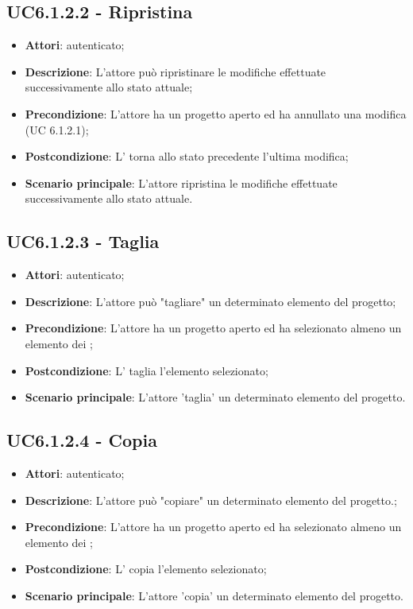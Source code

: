 \subsection{UC6.1.2.2 - Ripristina}
\label{ssec:UC6.1.2.2}
\begin{itemize}
\item \textbf{Attori}:  autenticato;
\item \textbf{Descrizione}: L’attore può ripristinare le modifiche effettuate successivamente allo stato attuale;
\item \textbf{Precondizione}: L’attore ha un progetto aperto ed ha annullato una modifica (UC 6.1.2.1);
\item \textbf{Postcondizione}: L’ torna allo stato precedente l’ultima modifica;
\item \textbf{Scenario principale}: L'attore ripristina le modifiche effettuate successivamente allo stato attuale.
\end{itemize}
\subsection{UC6.1.2.3 - Taglia}
\label{ssec:UC6.1.2.3}
\begin{itemize}
\item \textbf{Attori}:  autenticato;
\item \textbf{Descrizione}: L’attore può "tagliare" un determinato elemento del progetto;
\item \textbf{Precondizione}: L’attore ha un progetto aperto ed ha selezionato almeno un elemento dei ;
\item \textbf{Postcondizione}: L’ taglia l’elemento selezionato;
\item \textbf{Scenario principale}: L'attore 'taglia' un determinato elemento del progetto.
\end{itemize}
\subsection{UC6.1.2.4 - Copia}
\label{ssec:UC6.1.2.4}
\begin{itemize}
\item \textbf{Attori}:  autenticato;
\item \textbf{Descrizione}: L’attore può "copiare" un determinato elemento del progetto.;
\item \textbf{Precondizione}: L’attore ha un progetto aperto ed ha selezionato almeno un elemento dei ;
\item \textbf{Postcondizione}: L’ copia l’elemento selezionato;
\item \textbf{Scenario principale}: L'attore 'copia' un determinato elemento del progetto.
\end{itemize}
